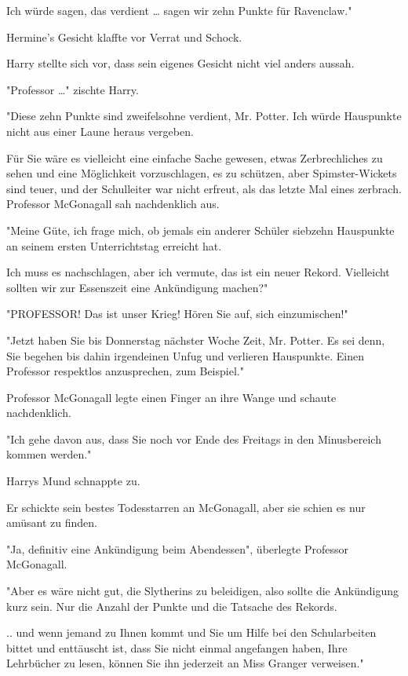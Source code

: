 {Ich würde sagen, das verdient … sagen wir zehn Punkte für Ravenclaw."

Hermine's Gesicht klaffte vor Verrat und Schock.

Harry stellte sich vor, dass sein eigenes Gesicht nicht viel anders aussah.

"Professor …" zischte Harry.

"Diese zehn Punkte sind zweifelsohne verdient, Mr. Potter. Ich würde Hauspunkte nicht aus einer Laune heraus vergeben.

Für Sie wäre es vielleicht eine einfache Sache gewesen, etwas Zerbrechliches zu sehen und eine Möglichkeit vorzuschlagen, es zu schützen, aber Spimster-Wickets sind teuer, und der Schulleiter war nicht erfreut, als das letzte Mal eines zerbrach. Professor McGonagall sah nachdenklich aus.

"Meine Güte, ich frage mich, ob jemals ein anderer Schüler siebzehn Hauspunkte an seinem ersten Unterrichtstag erreicht hat.

Ich muss es nachschlagen, aber ich vermute, das ist ein neuer Rekord. Vielleicht sollten wir zur Essenszeit eine Ankündigung machen?"

"PROFESSOR! Das ist unser Krieg! Hören Sie auf, sich einzumischen!"

"Jetzt haben Sie bis Donnerstag nächster Woche Zeit, Mr. Potter. Es sei denn, Sie begehen bis dahin irgendeinen Unfug und verlieren Hauspunkte. Einen Professor respektlos anzusprechen, zum Beispiel."

Professor McGonagall legte einen Finger an ihre Wange und schaute nachdenklich.

"Ich gehe davon aus, dass Sie noch vor Ende des Freitags in den Minusbereich kommen werden."

Harrys Mund schnappte zu.

Er schickte sein bestes Todesstarren an McGonagall, aber sie schien es nur amüsant zu finden.

"Ja, definitiv eine Ankündigung beim Abendessen", überlegte Professor McGonagall.

"Aber es wäre nicht gut, die Slytherins zu beleidigen, also sollte die Ankündigung kurz sein. Nur die Anzahl der Punkte und die Tatsache des Rekords.

.. und wenn jemand zu Ihnen kommt und Sie um Hilfe bei den Schularbeiten bittet und enttäuscht ist, dass Sie nicht einmal angefangen haben, Ihre Lehrbücher zu lesen, können Sie ihn jederzeit an Miss Granger verweisen."

}
